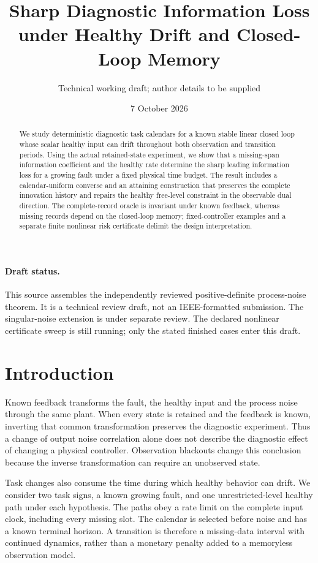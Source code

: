 \documentclass[11pt]{article}
\title{Sharp Diagnostic Information Loss under Healthy Drift and Closed-Loop Memory}
\author{Technical working draft; author details to be supplied}
\date{7 October 2026}
\begin{document}
\maketitle
\begin{abstract}
We study deterministic diagnostic task calendars for a known stable linear
closed loop whose scalar healthy input can drift throughout both observation
and transition periods.
Using the actual retained-state experiment, we show that a missing-span
information coefficient and the healthy rate determine the sharp leading
information loss for a growing fault under a fixed physical time budget.
The result includes a calendar-uniform converse and an attaining construction
that preserves the complete innovation history and repairs the healthy
free-level constraint in the observable dual direction.
The complete-record oracle is invariant under known feedback, whereas missing
records depend on the closed-loop memory; fixed-controller examples and a
separate finite nonlinear risk certificate delimit the design interpretation.
\end{abstract}

\paragraph{Draft status.}
This source assembles the independently reviewed positive-definite process-noise
theorem. It is a technical review draft, not an IEEE-formatted submission.
The singular-noise extension is under separate review. The declared nonlinear
certificate sweep is still running; only the stated finished cases enter this draft.

\section{Introduction}
Known feedback transforms the fault, the healthy input and the process noise
through the same plant. When every state is retained and the feedback is known,
inverting that common transformation preserves the diagnostic experiment.
Thus a change of output noise correlation alone does not describe the diagnostic
effect of changing a physical controller. Observation blackouts change this
conclusion because the inverse transformation can require an unobserved state.

Task changes also consume the time during which healthy behavior can drift.
We consider two task signs, a known growing fault, and one unrestricted-level
healthy path under each hypothesis. The paths obey a rate limit on the complete
input clock, including every missing slot. The calendar is selected before noise
and has a known terminal horizon. A transition is therefore a missing-data
interval with continued dynamics, rather than a monetary penalty added to a
memoryless observation model.
\end{document}
